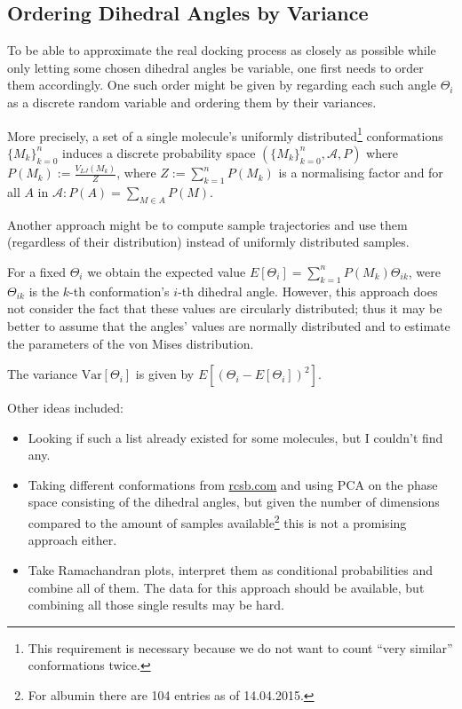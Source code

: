 \subsection{Ordering Dihedral Angles by Variance}
To be able to approximate the real docking process as closely as possible while only letting some chosen dihedral angles be variable, one first needs to order them accordingly. One such order might be given by regarding each such angle $\Theta_i$ as a discrete random variable and ordering them by their variances.

More precisely, a set of a single molecule's uniformly distributed\footnote{This requirement is necessary because we do not want to count ``very similar'' conformations twice.} conformations $\{M_k\}_{k=0}^n$ induces a discrete probability space $(\{M_k\}_{k=0}^n,\mathscr{A},P)$ where $P(M_k):=\frac{V_{LJ}(M_k)}{Z}$, where $Z:=\sum_{k=1}^n P(M_k)$ is a normalising factor and for all $A$ in $\mathscr{A}: P(A) = \sum_{M\in A}P(M)$. 

Another approach might be to compute sample trajectories and use them (regardless of their distribution) instead of uniformly distributed samples.

For a fixed $\Theta_i$ we obtain the expected value $E[\Theta_i] = \sum_{k=1}^n P(M_k)\Theta_{ik}$, were $\Theta_{ik}$ is the $k$-th conformation's $i$-th dihedral angle. However, this approach does not consider the fact that these values are circularly distributed; thus it may be better to assume that the angles' values are normally distributed and to estimate the parameters of the von Mises distribution.

The variance $\text{Var}[\Theta_i]$ is given by $E[(\Theta_i - E[\Theta_i])^2]$.

Other ideas included:
\begin{itemize}
	\item Looking if such a list already existed for some molecules, but I couldn't find any.
	\item Taking different conformations from \url{rcsb.com} and using PCA on the phase space consisting of the dihedral angles, but given the number of dimensions compared to the amount of samples available\footnote{For albumin there are 104 entries as of 14.04.2015.} this is not a promising approach either.
	\item Take Ramachandran plots, interpret them as conditional probabilities and combine all of them. The data for this approach should be available, but combining all those single results may be hard.
\end{itemize}

